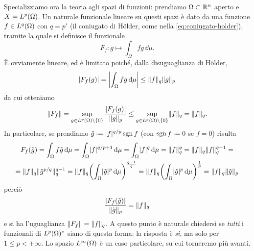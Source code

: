 Specializziamo ora la teoria agli spazi di funzioni: prendiamo $\Omega\subset\R^n$ aperto e $X=\leb[p]{\Omega}$.
Un naturale funzionale lineare su questi spazi è dato da una funzione $f\in\leb[q]{\Omega}$ con $q=p'$ (il coniugato di Hölder, come nella \eqref{eq:coniugato-holder}), tramite la quale si definisce il funzionale\label{pag:norma-funzionale-lineare}
\begin{equation}
    F_f\colon g\mapsto\int_\Omega fg\,\dd\mu.
\end{equation}
È ovviamente lineare, ed è limitato poich\'e, dalla disuguaglianza di Hölder,
\begin{equation}
    \abs{F_f(g)}=
    \abs[\bigg]{\int_\Omega fg\,\dd\mu}\le
    \norm{f}_q\norm{g}_p
\end{equation}
da cui otteniamo
\begin{equation}
    \norm{F_f}=
    \sup_{g\in\leb[p]{\Omega}\setminus\{0\}}\frac{\abs{F_f(g)}}{\norm{g}_p}\le
    \sup_{g\in\leb[p]{\Omega}\setminus\{0\}}\norm{f}_q=
    \norm{f}_q.
\end{equation}
In particolare, se prendiamo $\tilde{g}\defeq\abs{f}^{q/p}\sgn f$ (con $\sgn f\defeq 0$ se $f=0$) risulta
\begin{multline}
    F_f(\tilde{g})=
    \int_\Omega f\tilde{g}\,\dd\mu=
    \int_\Omega \abs{f}^{q/p+1}\,\dd\mu=
    \int_\Omega \abs{f}^q\,\dd\mu=
    \norm{f}_q^q=
    \norm{f}_q\norm{f}_q^{q-1}=\\=
    \norm{f}_q\norm{\tilde{g}^{p/q}}_q^{q-1}=
    \norm{f}_q\biggl(\int_\Omega \abs{\tilde{g}}^p\,\dd\mu\biggr)^{\frac{q-1}{q}}=
    \norm{f}_q\biggl(\int_\Omega \abs{\tilde{g}}^p\,\dd\mu\biggr)^{\frac1{p}}=
    \norm{f}_q\norm{\tilde{g}}_p
\end{multline}
perciò
\begin{equation}
    \frac{\abs{F_f(\tilde{g})}}{\norm{\tilde{g}}_p}=\norm{f}_q
\end{equation}
e si ha l'uguaglianza $\norm{F_f}=\norm{f}_q$.
A questo punto è naturale chiedersi se \emph{tutti} i funzionali di $\dual{\leb[p]{\Omega}}$ siano di questa forma: la risposta è \emph{s\`i}, ma solo per $1\le p<+\infty$.
Lo spazio $\leb[\infty]{\Omega}$ è un caso particolare, su cui torneremo più avanti.

